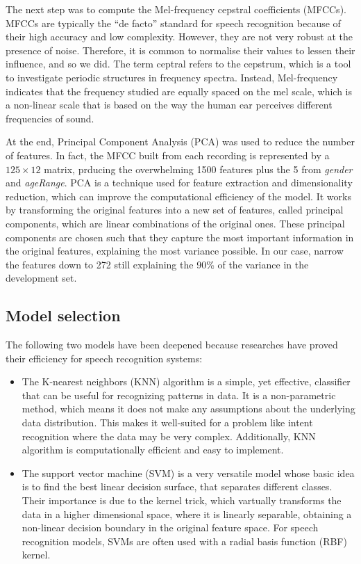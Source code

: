 \documentclass[conference]{IEEEtran}
\begin{document}
The next step was to compute the Mel-frequency cepstral coefficients (MFCCs).
MFCCs are typically the “de facto” standard for speech recognition because of their high accuracy and low complexity.
However, they are not very robust at the presence of noise.
Therefore, it is common to normalise their values to lessen their influence, and so we did.
The term ceptral refers to the cepstrum, which is a tool to investigate periodic structures in frequency spectra.
Instead, Mel-frequency indicates that the frequency studied are equally spaced on the mel scale, which is a non-linear scale that is based on the way the human ear perceives different frequencies of sound.

At the end, Principal Component Analysis (PCA) was used to reduce the number of features.
In fact, the MFCC built from each recording is represented by a $125 \times 12$ matrix, prducing the overwhelming 1500 features plus the 5 from \textit{gender} and \textit{ageRange}.
PCA is a technique used for feature extraction and dimensionality reduction, which can improve the computational efficiency of the model.
It works by transforming the original features into a new set of features, called principal components, which are linear combinations of the original ones.
These principal components are chosen such that they capture the most important information in the original features, explaining the most variance possible.
In our case, narrow the features down to 272 still explaining the 90\% of the variance in the development set.

\subsection{Model selection}
The following two models have been deepened because researches have proved their efficiency for speech recognition systems:
\begin{itemize}
    \item The K-nearest neighbors (KNN) algorithm is a simple, yet effective, classifier that can be useful for recognizing patterns in data.
    It is a non-parametric method, which means it does not make any assumptions about the underlying data distribution.
    This makes it well-suited for a problem like intent recognition where the data may be very complex.
    Additionally, KNN algorithm is computationally efficient and easy to implement.

    \item The support vector machine (SVM) is a very versatile model whose basic idea is to find the best linear decision surface, that separates different classes.
    Their importance is due to the kernel trick, which vartually transforms the data in a higher dimensional space, where it is linearly separable, obtaining a non-linear decision boundary in the original feature space.
    For speech recognition models, SVMs are often used with a radial basis function (RBF) kernel.
\end{itemize}
\end{document}
